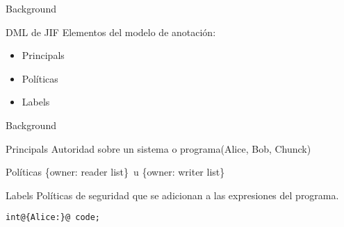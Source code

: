 \begin{frame}{Background}
	\begin{block}{DML de JIF}
		Elementos del modelo de anotación:
		\begin{itemize}
		  \item Principals
		  \item Políticas
		  \item Labels
		\end{itemize}
	\end{block}
\end{frame}
\begin{frame}[fragile]{Background}
	\begin{block}{Principals}
		Autoridad sobre un sistema o programa(Alice, Bob, Chunck)
	\end{block}
	\pause
	\begin{block}{Políticas}
		\{owner: reader list\}\ u \{owner: writer list\}
	\end{block}
	\pause
	\begin{block}{Labels} 
		Políticas de seguridad que se adicionan a las expresiones del programa.
		\begin{lstlisting}[style=base]
			int@{Alice:}@ code;
		\end{lstlisting}
	\end{block}
\end{frame}
